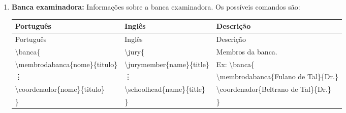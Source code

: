\documentclass{book}
\newcommand{\bs}{\textbackslash}
\newcommand{\nl}{\\ & &}
\newcommand{\newrow}[4]{
  \bs #1 & \bs #2 & #3 \nl
                    #4 \nl \\
}
\newenvironment{mytable}{
\begin{longtable}{ p{4.8cm} p{4.3cm} p{8cm} }

\hline
  Português      & Inglês     & Descrição  \\
  \hline
\endfirsthead

\hline
  Português      & Inglês     & Descrição  \\
  \hline
\endhead

\hline
\endfoot
}{
\end{longtable}
}
\begin{document}
\begin{enumerate}
\begin{mytable}
    \newrow{ano\{ano\}}{yyyy\{year\}}
           {Ano que aparecerá na capa e na contra capa do trabalho.}
           {Ex: \bs ano\{2018\}}
           
    \newrow{cidade\{texto\}}{city\{text\}}
           {Cidade na qual foi apresentado o trabalho.}
           {Ex: \bs cidade\{Rio de Janeiro\}}
           
    \newrow{departamento\{texto\}}{department\{text\}}
           {Departamento para o qual foi apresentado o trabalho.}
           {Ex: \bs departamento\{Engenharia Civil e Ambiental\}}
           
    \newrow{programa\{texto\}}{program\{text\}}
           {Programa pelo qual receberá o título.}
           {Ex: \bs programa\{Engenharia Civil\}}
           
    \newrow{centro\{texto\}}{school\{text\}}
           {Centro pelo qual receberá o título.}
           {Ex: \bs centro\{Centro Técnico Científico\}}
           
    \newrow{universidade\{texto\}}{university\{text\}}
           {Universidade pelo qual receberá o título.}
           {Ex: \bs universidade\{Pontifícia Universidade Católica do Rio de Janeiro\}}
           
    \newrow{universidade\{texto\}}{university\{text\}}
           {Universidade pelo qual receberá o título.}
           {Ex: \bs universidade\{Pontifícia Universidade Católica do Rio de Janeiro\}}
           
    \newrow{uni\{texto\}}{uni\{text\}}
           {Abreviação da universidade pelo qual receberá o título.}
           {Ex: \bs uni\{PUC-Rio\}}
         
  \end{mytable}

  \item \textbf{Banca examinadora:} Informações sobre a banca examinadora. Os possíveis comandos são:

  \begin{mytable}
    \bs banca\{                & \bs jury\{ &  Membros da banca. \\
    \indent \bs membrodabanca\{nome\}\{titulo\}  &\indent \bs jurymember\{name\}\{title\} & Ex: \bs banca\{ \\
    \indent \vdots     &\indent \vdots  & \hspace{0.5cm}\bs membrodabanca\{Fulano de Tal\}\{Dr.\} \\
    \indent \bs coordenador\{nome\}\{titulo\}      & \indent \bs schoolhead\{name\}\{title\}   & \hspace{0.5cm}\bs coordenador\{Beltrano de Tal\}\{Dr.\}\\
    \}                        & \}    & \} \\
  \end{mytable}



\end{enumerate}
\end{document}
